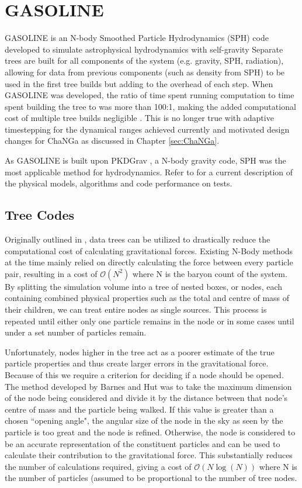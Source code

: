 \section{GASOLINE}

GASOLINE \citep{gasoline} is an N-body Smoothed Particle Hydrodynamics (SPH) code developed to simulate astrophysical hydrodynamics with self-gravity Separate trees are built for all components of the system (e.g. gravity, SPH, radiation), allowing for data from previous components (such as density from SPH) to be used in the first tree builds but adding to the overhead of each step. When GASOLINE was developed, the ratio of time spent running computation to time spent building the tree to was more than 100:1, making the added computational cost of multiple tree builds negligible \citep{rory}. This is no longer true with adaptive timestepping for the dynamical ranges achieved currently and motivated design changes for ChaNGa as discussed in Chapter \ref{sec:ChaNGa}.

As GASOLINE is built upon PKDGrav \citep{pkdgrav}, a N-body gravity code, SPH was the most applicable method for hydrodynamics. Refer to \citet{wadsley2017} for a current description of the physical models, algorithms and code performance on tests. 

\subsection{Tree Codes}

Originally outlined in \cite{gravity}, data trees can be utilized to drastically reduce the computational cost of calculating gravitational forces. Existing N-Body methods at the time mainly relied on directly calculating the force between every particle pair, resulting in a cost of $\mathcal{O}(N^2)$ where N is the baryon count of the system. By splitting the simulation volume into a tree of nested boxes, or nodes, each containing combined physical properties such as the total and centre of mass of their children, we can treat entire nodes as single sources. This process is repeated until either only one particle remains in the node or in some cases until under a set number of particles remain.

Unfortunately, nodes higher in the tree act as a poorer estimate of the true particle properties and thus create larger errors in the gravitational force. Because of this we require a criterion for deciding if a node should be opened. The method developed by Barnes and Hut was to take the maximum dimension of the node being considered and divide it by the distance between that node's centre of mass and the particle being walked. If this value is greater than a chosen ``opening angle", the angular size of the node in the sky as seen by the particle is too great and the node is refined. Otherwise, the node is considered to be an accurate representation of the constituent particles and can be used to calculate their contribution to the gravitational force. This substantially reduces the number of calculations required, giving a cost of $\mathcal{O}(N \log(N))$ where N is the number of particles (assumed to be proportional to the number of tree nodes. 

